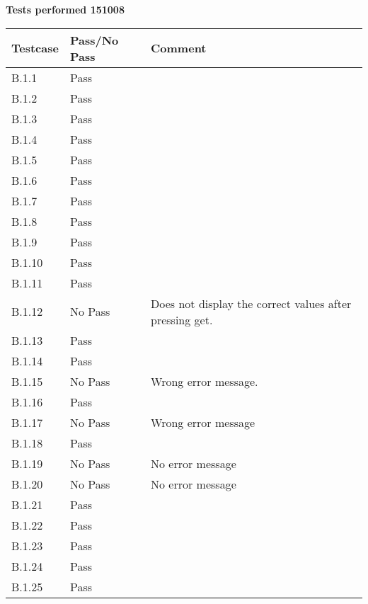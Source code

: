 \renewcommand{\testdate}{151008}
\textbf{ Tests performed \testdate}
\begin{center}
  		\begin{tabular}{| p{3cm} | p{5cm} | p{5cm} |}
    		\hline
	    	\textbf{Testcase}			& \textbf{Pass/No Pass} 	& \textbf{Comment} \\ \hline
    		B.1.1		 						& Pass 										&  				\\ \hline
    		B.1.2		 						& Pass 										& 				 \\	\hline
    		B.1.3		 						& Pass 										& 				 \\	\hline
    		B.1.4		 						& Pass 										& 				 \\	\hline
    		B.1.5		 						& Pass 										& 				 \\	\hline
    		B.1.6		 						& Pass 										& 				 \\	\hline
    		B.1.7		 						& Pass 										& 				 \\	\hline
    		B.1.8		 						& Pass 										& 				 \\	\hline
    		B.1.9		 						& Pass 										& 				 \\	\hline
    		B.1.10	 							& Pass 										& 				 \\	\hline
    		B.1.11	 							& Pass 										& 				 \\	\hline
    		B.1.12	 							& No Pass 										& Does not display the correct values after pressing get.				 \\	\hline
    		B.1.13	 							& Pass 										& 				 \\	\hline
    		B.1.14	 							& Pass 										& 				 \\	\hline
    		B.1.15	 							& No Pass 										& Wrong error message.				 \\	\hline
    		B.1.16	 							& Pass 										& 				 \\	\hline
    		B.1.17	 							& No Pass								& Wrong error message				 \\	\hline
    		B.1.18	 							& Pass 										& 				 \\	\hline
    		B.1.19	 							& No Pass 										& No error message				 \\	\hline
    		B.1.20	 							& No Pass 										& No error message \\ \hline
    		B.1.21	 							& Pass 										& \\ \hline
    		B.1.22	 							& Pass										&  \\ \hline
    		B.1.23	 							& Pass											&  \\ \hline
    		B.1.24	 							& Pass											&  \\ \hline
    		B.1.25	 							& Pass											&  \\ \hline
 		 \end{tabular}
	\end{center}